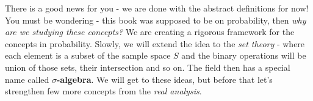 There is a good news for you - we are done with the abstract definitions for now! You must be wondering - this book was supposed to be on probability, then \textit{why are we studying these concepts?} We are creating a rigorous framework for the concepts in probability. Slowly, we will extend the idea to the \textit{set theory} - where each element is a subset of the sample space $S$ and the binary operations will be union of those sets, their intersection and so on. The field then has a special name called \textbf{$\sigma$-algebra}. We will get to these ideas, but before that let's strengthen few more concepts from the \textit{real analysis}. \\